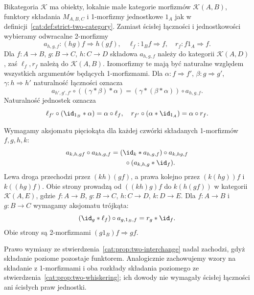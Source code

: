 \begin{definicja}[Bikategoria]\label{cat:def:bicategory}
Bikategoria $\mathcal K$ ma obiekty, lokalnie małe kategorie morfizmów $\mathcal K(A,B)$, funktory składania $M_{A,B,C}$ i 1-morfizmy jednostkowe $1_A$ jak w definicji~\ref{cat:def:strict-two-category}. Zamiast ścisłej łączności i jednostkowości wybieramy odwracalne 2-morfizmy
\[
 a_{h,g,f}:(hg)f\Rightarrow h(gf),\quad
 \ell_f:1_Bf\Rightarrow f,\quad r_f:f1_A\Rightarrow f.
\]
Dla $f:A\to B$, $g:B\to C$, $h:C\to D$ składowa $a_{h,g,f}$ należy do kategorii $\mathcal K(A,D)$, zaś $\ell_f,r_f$ należą do $\mathcal K(A,B)$. Izomorfizmy te mają być naturalne względem wszystkich argumentów będących 1-morfizmami. Dla $\alpha:f\Rightarrow f'$, $\beta:g\Rightarrow g'$, $\gamma:h\Rightarrow h'$ naturalność łączności oznacza
\[
 a_{h',g',f'}\circ((\gamma\ast\beta)\ast\alpha)
 =(\gamma\ast(\beta\ast\alpha))\circ a_{h,g,f}.
\]
Naturalność jednostek oznacza
\[
 \ell_{f'}\circ(\id_{1_B}\ast\alpha)=\alpha\circ\ell_f,\quad
 r_{f'}\circ(\alpha\ast\id_{1_A})=\alpha\circ r_f.
\]

Wymagamy aksjomatu pięciokąta dla każdej czwórki składanych 1-morfizmów $f,g,h,k$:
\begin{equation}\label{cat:eq:bicat-pentagon}
\begin{aligned}
 a_{k,h,gf}\circ a_{kh,g,f}
 &=(\id_k\ast a_{h,g,f})\circ a_{k,hg,f}\\
 &\qquad\circ(a_{k,h,g}\ast\id_f).
\end{aligned}
\end{equation}
Lewa droga przechodzi przez $(kh)(gf)$, a prawa kolejno przez $(k(hg))f$ i $k((hg)f)$. Obie strony prowadzą od $((kh)g)f$ do $k(h(gf))$ w kategorii $\mathcal K(A,E)$, gdzie $f:A\to B$, $g:B\to C$, $h:C\to D$, $k:D\to E$.
Dla $f:A\to B$ i $g:B\to C$ wymagamy aksjomatu trójkąta:
\begin{equation}\label{cat:eq:bicat-triangle}
 (\id_g\ast\ell_f)\circ a_{g,1_B,f}=r_g\ast\id_f.
\end{equation}
Obie strony są 2-morfizmami $(g1_B)f\Rightarrow gf$.
\end{definicja}

Prawo wymiany ze stwierdzenia~\ref{cat:prop:two-interchange} nadal zachodzi, gdyż składanie poziome pozostaje funktorem. Analogicznie zachowujemy wzory na składanie z 1-morfizmami i oba rozkłady składania poziomego ze stwierdzenia~\ref{cat:prop:two-whiskering}; ich dowody nie wymagały ścisłej łączności ani ścisłych praw jednostki.

